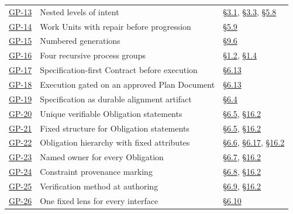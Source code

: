 \begin{longtable}{@{}p{} p{} p{}@{}}
\hyperlink{gp-13}{GP-13} & Nested levels of intent & \hyperlink{nss-3.1}{\S3.1}, \hyperlink{nss-3.3}{\S3.3}, \hyperlink{nss-5.8}{\S5.8} \\

\hyperlink{gp-14}{GP-14} & Work Units with repair before progression & \hyperlink{nss-5.9}{\S5.9} \\

\hyperlink{gp-15}{GP-15} & Numbered generations & \hyperlink{nss-9.6}{\S9.6} \\

\hyperlink{gp-16}{GP-16} & Four recursive process groups & \hyperlink{nss-1.2}{\S1.2}, \hyperlink{nss-1.4}{\S1.4} \\

\hyperlink{gp-17}{GP-17} & Specification-first Contract before execution & \hyperlink{nss-6.13}{\S6.13} \\

\hyperlink{gp-18}{GP-18} & Execution gated on an approved Plan Document & \hyperlink{nss-6.13}{\S6.13} \\

\hyperlink{gp-19}{GP-19} & Specification as durable alignment artifact & \hyperlink{nss-6.4}{\S6.4} \\

\hyperlink{gp-20}{GP-20} & Unique verifiable Obligation statements & \hyperlink{nss-6.5}{\S6.5}, \hyperlink{nss-16.2}{\S16.2} \\

\hyperlink{gp-21}{GP-21} & Fixed structure for Obligation statements & \hyperlink{nss-6.5}{\S6.5}, \hyperlink{nss-16.2}{\S16.2} \\

\hyperlink{gp-22}{GP-22} & Obligation hierarchy with fixed attributes & \hyperlink{nss-6.6}{\S6.6}, \hyperlink{nss-6.17}{\S6.17}, \hyperlink{nss-16.2}{\S16.2} \\

\hyperlink{gp-23}{GP-23} & Named owner for every Obligation & \hyperlink{nss-6.7}{\S6.7}, \hyperlink{nss-16.2}{\S16.2} \\

\hyperlink{gp-24}{GP-24} & Constraint provenance marking & \hyperlink{nss-6.8}{\S6.8}, \hyperlink{nss-16.2}{\S16.2} \\

\hyperlink{gp-25}{GP-25} & Verification method at authoring & \hyperlink{nss-6.9}{\S6.9}, \hyperlink{nss-16.2}{\S16.2} \\

\hyperlink{gp-26}{GP-26} & One fixed lens for every interface & \hyperlink{nss-6.10}{\S6.10} \\


\end{longtable}
